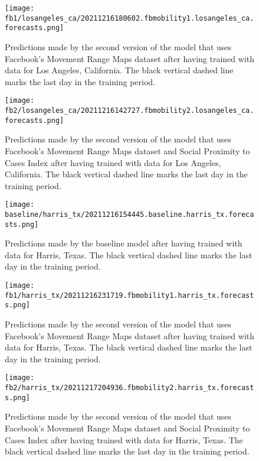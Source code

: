 \begin{figure}[!htb]
    \centering
    \texttt{[image: fb1/losangeles\_ca/20211216180602.fbmobility1.losangeles\_ca.forecasts.png]}
    \caption{Predictions made by the second version of the model that uses Facebook's Movement Range Maps dataset after having trained with data for Los Angeles, California. The black vertical dashed line marks the last day in the training period.}
    \label{fig:predictions-losangeles-fb1}
\end{figure}

\begin{figure}[!htb]
    \centering
    \texttt{[image: fb2/losangeles\_ca/20211216142727.fbmobility2.losangeles\_ca.forecasts.png]}
    \caption{Predictions made by the second version of the model that uses Facebook's Movement Range Maps dataset and Social Proximity to Cases Index after having trained with data for Los Angeles, California. The black vertical dashed line marks the last day in the training period.}
    \label{fig:predictions-losangeles-fb2}
\end{figure}


\begin{figure}[!htb]
    \centering
    \texttt{[image: baseline/harris\_tx/20211216154445.baseline.harris\_tx.forecasts.png]}
    \caption{Predictions made by the baseline model after having trained with data for Harris, Texas. The black vertical dashed line marks the last day in the training period.}
    \label{fig:predictions-harris-baseline}
\end{figure}

\begin{figure}[!htb]
    \centering
    \texttt{[image: fb1/harris\_tx/20211216231719.fbmobility1.harris\_tx.forecasts.png]}
    \caption{Predictions made by the second version of the model that uses Facebook's Movement Range Maps dataset after having trained with data for Harris, Texas. The black vertical dashed line marks the last day in the training period.}
    \label{fig:predictions-harris-fb1}
\end{figure}

\begin{figure}[!htb]
    \centering
    \texttt{[image: fb2/harris\_tx/20211217204936.fbmobility2.harris\_tx.forecasts.png]}
    \caption{Predictions made by the second version of the model that uses Facebook's Movement Range Maps dataset and Social Proximity to Cases Index after having trained with data for Harris, Texas. The black vertical dashed line marks the last day in the training period.}
    \label{fig:predictions-harris-fb2}
\end{figure}

